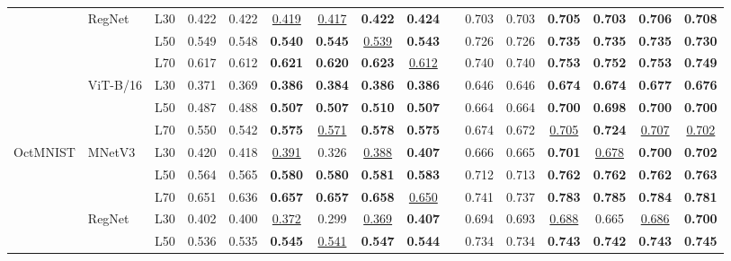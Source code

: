 \begin{table}[t]
{\begin{tabular}{lll cccccc |c cccccc}
\cmidrule(lr){2-16}
 & \multirow{3}{*}{RegNet} & L30 & 0.422 & 0.422 & \underline{0.419} & \underline{0.417} & \textbf{0.422} & \textbf{0.424} & & 0.703 & 0.703 & \textbf{0.705} & \textbf{0.703} & \textbf{0.706} & \textbf{0.708} \\
 &  & L50 & 0.549 & 0.548 & \textbf{0.540} & \textbf{0.545} & \underline{0.539} & \textbf{0.543} & & 0.726 & 0.726 & \textbf{0.735} & \textbf{0.735} & \textbf{0.735} & \textbf{0.730} \\
 &  & L70 & 0.617 & 0.612 & \textbf{0.621} & \textbf{0.620} & \textbf{0.623} & \underline{0.612} & & 0.740 & 0.740 & \textbf{0.753} & \textbf{0.752} & \textbf{0.753} & \textbf{0.749} \\
\cmidrule(lr){2-16}
 & \multirow{3}{*}{ViT-B/16} & L30 & 0.371 & 0.369 & \textbf{0.386} & \textbf{0.384} & \textbf{0.386} & \textbf{0.386} & & 0.646 & 0.646 & \textbf{0.674} & \textbf{0.674} & \textbf{0.677} & \textbf{0.676} \\
 &  & L50 & 0.487 & 0.488 & \textbf{0.507} & \textbf{0.507} & \textbf{0.510} & \textbf{0.507} & & 0.664 & 0.664 & \textbf{0.700} & \textbf{0.698} & \textbf{0.700} & \textbf{0.700} \\
 &  & L70 & 0.550 & 0.542 & \textbf{0.575} & \underline{0.571} & \textbf{0.578} & \textbf{0.575} & & 0.674 & 0.672 & \underline{0.705} & \textbf{0.724} & \underline{0.707} & \underline{0.702} \\
\midrule
\multirow{9}{*}{OctMNIST} & \multirow{3}{*}{MNetV3} & L30 & 0.420 & 0.418 & \underline{0.391} & 0.326 & \underline{0.388} & \textbf{0.407} & & 0.666 & 0.665 & \textbf{0.701} & \underline{0.678} & \textbf{0.700} & \textbf{0.702} \\
 &  & L50 & 0.564 & 0.565 & \textbf{0.580} & \textbf{0.580} & \textbf{0.581} & \textbf{0.583} & & 0.712 & 0.713 & \textbf{0.762} & \textbf{0.762} & \textbf{0.762} & \textbf{0.763} \\
 &  & L70 & 0.651 & 0.636 & \textbf{0.657} & \textbf{0.657} & \textbf{0.658} & \underline{0.650} & & 0.741 & 0.737 & \textbf{0.783} & \textbf{0.785} & \textbf{0.784} & \textbf{0.781} \\
\cmidrule(lr){2-16}
 & \multirow{3}{*}{RegNet} & L30 & 0.402 & 0.400 & \underline{0.372} & 0.299 & \underline{0.369} & \textbf{0.407} & & 0.694 & 0.693 & \underline{0.688} & 0.665 & \underline{0.686} & \textbf{0.700} \\
 &  & L50 & 0.536 & 0.535 & \textbf{0.545} & \underline{0.541} & \textbf{0.547} & \textbf{0.544} & & 0.734 & 0.734 & \textbf{0.743} & \textbf{0.742} & \textbf{0.743} & \textbf{0.745} \\

\end{tabular}}
\end{table}
